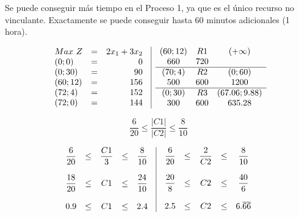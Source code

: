 \documentclass[12pt]{article}
\begin{document}
\newpage
\noindent Se puede conseguir más tiempo en el Proceso 1, ya que es el único recurso no vinculante.
Exactamente se puede conseguir hasta 60 minutos adicionales (1 hora).

\vspace{1cm}

\[
\begin{array}{c|c}
  \begin{array}{l c r}
    Max \ Z & = & 2x_1 + 3x_2 \\
    (0; 0) & = & 0 \\
    (0; 30) & = & 90 \\
    (60; 12) & = & 156 \\
    (72; 4) & = & 152 \\
    (72; 0) & = & 144 \\
  \end{array}
  &
  \begin{array}{c c c}
    (60; 12) & R1 & (+\infty)\\
    660 & 720 & \\
    \hline
    (70; 4) & R2 & (0; 60) \\
    500 & 600 & 1200 \\
    \hline
    (0; 30) & R3 & (67.06; 9.88)\\
    300 & 600 & 635.28
  \end{array}
\end{array}
\]

\vspace{1cm}

\[ \dfrac{6}{20} \leq \dfrac{\left|C1\right|}{\left|C2\right|} \leq \dfrac{8}{10} \]

\[
\begin{array}{c|c}
  \begin{array}{c c c c c}
    \dfrac{6}{20} & \leq & \dfrac{C1}{3} & \leq & \dfrac{8}{10} \\\\
    \dfrac{18}{20} & \leq & C1 & \leq & \dfrac{24}{10} \\\\
    0.9 & \leq & C1 & \leq & 2.4
  \end{array}
  &
  \begin{array}{c c c c c}
    \dfrac{6}{20} & \leq & \dfrac{2}{C2} & \leq & \dfrac{8}{10} \\\\
    \dfrac{20}{8} & \leq & C2 &\leq & \dfrac{40}{6} \\\\
    2.5 & \leq & C2 & \leq & 6.\overline{66} 
  \end{array}
\end{array}
\]
\end{document}
